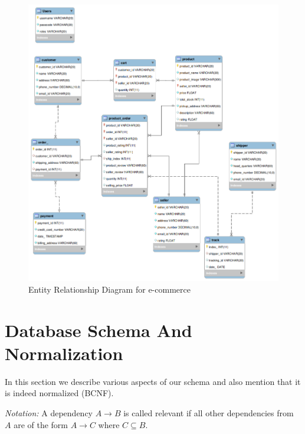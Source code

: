 \documentclass[a4paper,12pt]{article}
\newcommand{\ita}[1]{
    \textit{#1}
}
\begin{document}
\begin{figure}[H]
    \centering
    \includegraphics[width=1\textwidth]{ERDL} 
    \caption{Entity Relationship Diagram for e-commerce}
\end{figure}


\section{Database Schema And Normalization}
In this section we describe various aspects of our schema and also mention that it is indeed normalized (BCNF).

\ita{Notation: }A dependency $A \rightarrow B$ is called relevant if all other dependencies from $A$ are of the form $A \rightarrow C$ where $C \subseteq B$.
\end{document}
